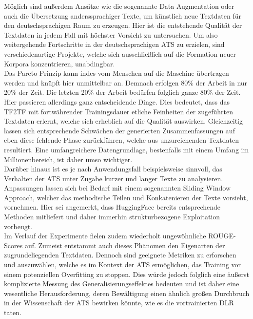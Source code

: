 \noindent
Möglich sind außerdem Ansätze wie die sogenannte Data Augmentation oder auch die Übersetzung anderssprachiger Texte, um künstlich neue Textdaten für den deutschsprachigen Raum zu erzeugen. Hier ist die entstehende Qualität der Textdaten in jedem Fall mit höchster Vorsicht zu untersuchen. Um also weitergehende Fortschritte in der deutschsprachigen \ac{ATS} zu erzielen, sind verschiedenartige Projekte, welche sich ausschließlich auf die Formation neuer Korpora konzentrieren, unabdingbar.\\

\noindent
Das Pareto-Prinzip kann indes vom Menschen auf die Maschine übertragen werden und knüpft hier unmittelbar an. Demnach erfolgen 80\% der Arbeit in nur 20\% der Zeit. Die letzten 20\% der Arbeit bedürfen folglich ganze 80\% der Zeit. Hier passieren allerdings ganz entscheidende Dinge. Dies bedeutet, dass das \ac{TF2TF} mit fortwährender Trainingsdauer etliche Feinheiten der zugeführten Textdaten erlernt, welche sich erheblich auf die Qualität auswirken. Gleichzeitig lassen sich entsprechende Schwächen der generierten Zusammenfassungen auf eben diese fehlende Phase zurückführen, welche aus unzureichenden Textdaten resultiert. Eine umfangreichere Datengrundlage, bestenfalls mit einem Umfang im Millionenbereich, ist daher umso wichtiger.\\

\noindent
Darüber hinaus ist es je nach Anwendungsfall beispielsweise sinnvoll, das Verhalten der \ac{ATS} unter Zugabe kurzer und langer Texte zu analysieren. Anpassungen lassen sich bei Bedarf mit einem sogenannten Sliding Window Approach, welcher das methodische Teilen und Konkatenieren der Texte vorsieht, vornehmen. Hier sei angemerkt, dass HuggingFace bereits entsprechende Methoden mitliefert und daher immerhin strukturbezogene Exploitation vorbeugt.\\

\noindent
Im Verlauf der Experimente fielen zudem wiederholt ungewöhnliche \ac{ROUGE}-Scores auf. Zumeist entstammt auch dieses Phänomen den Eigenarten der zugrundeliegenden Textdaten. Dennoch sind geeignete Metriken zu erforschen und auszuwählen, welche es im Kontext der \ac{ATS} ermöglichen, das Training vor einem potenziellen Overfitting zu stoppen. Dies würde jedoch folglich eine äußerst komplizierte Messung des Generalisierungseffektes bedeuten und ist daher eine wesentliche Herausforderung, deren Bewältigung einen ähnlich großen Durchbruch in der Wissenschaft der \ac{ATS} bewirken könnte, wie es die vortrainierten \ac{DLR} taten.
\newpage

